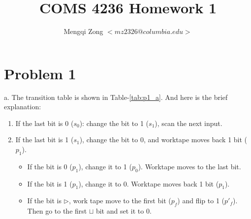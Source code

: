 \documentclass[12pt]{article}
\title{COMS 4236 Homework 1}
\author{Mengqi Zong $<mz2326@columbia.edu>$}
\begin{document}
\maketitle

\setlength{\parindent}{0in}

\section{Problem 1}


a. The transition table is shown in Table-\ref{tab:p1_a}. And here is
the brief explanation:

\begin{enumerate}
\item If the last bit is 0 ($s_0$): change the bit to 1 ($s_1$),
  scan the next input.
\item If the last bit is 1 ($s_1$), change the bit to 0, and
  worktape moves back 1 bit ($p_1$).
  \begin{itemize}
  \item If the bit is 0 ($p_1$), change it to 1 ($p_0$). Worktape
    moves to the last bit.
  \item If the bit is 1 ($p_1$), change it to 0. Worktape moves back
    1 bit ($p_1$).
  \item If the bit is $\triangleright$, work tape move to the first
    bit ($p_f$) and flip to 1 ($p'_f$). Then go to the first $\sqcup$
    bit and set it to 0.
  \end{itemize}
\end{enumerate}
\end{document}

